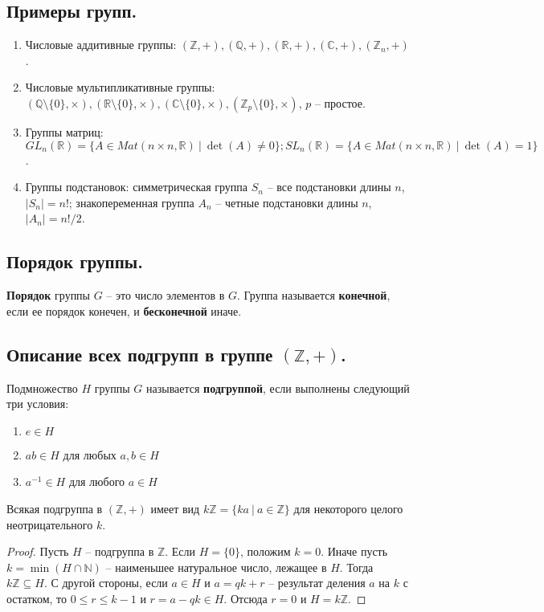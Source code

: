 \subsection{Примеры групп.}
\begin{enumerate}
    \item Числовые аддитивные группы: $(\mathbb{Z}, +), (\mathbb{Q}, +), (\mathbb{R}, +), (\mathbb{C}, +), (\mathbb{Z}_n, +)$.
    \item Числовые мультипликативные группы: $(\mathbb{Q} \setminus \{0\}, \times), (\mathbb{R} \setminus \{0\}, \times), (\mathbb{C} \setminus \{0\}, \times), (\mathbb{Z}_p \setminus \{0\}, \times)$, $p$ -- простое.
    \item Группы матриц: $GL_n(\mathbb{R}) = \{A \in Mat(n \times n, \mathbb{R}) \> | \> \det(A) \neq 0 \}; SL_n(\mathbb{R}) = \{A \in Mat(n \times n, \mathbb{R}) \> | \> \det(A) = 1 \}$.
    \item Группы подстановок: симметрическая группа $S_n$ -- все подстановки длины $n$, $|S_n| = n!$; знакопеременная группа $A_n$ -- четные подстановки длины $n$, $|A_n| = n!/2$.
\end{enumerate}

\subsection{Порядок группы.}
\begin{definition}
    \textbf{Порядок} группы $G$ -- это число элементов в $G$. Группа называется \textbf{конечной}, если ее порядок конечен, и \textbf{бесконечной} иначе.
\end{definition}


\subsection{Описание всех подгрупп в группе $(\mathbb{Z}, +)$.}
\begin{definition}
    Подмножество $H$ группы $G$ называется \textbf{подгруппой}, если выполнены следующий три условия:
    \begin{enumerate}
        \item $e \in H$
        \item $ab \in H$ для любых $a,b \in H$
        \item $a^{-1} \in H$ для любого $a \in H$
    \end{enumerate}
\end{definition}
\begin{statement}
    Всякая подгруппа в $(\mathbb{Z}, +)$ имеет вид $k\mathbb{Z} = \{ ka \> | \> a \in \mathbb{Z} \}$ для некоторого целого неотрицательного $k$.
    \begin{proof}
        Пусть $H$ -- подгруппа в $\mathbb{Z}$. Если $H = \{0\}$, положим $k = 0$. Иначе пусть $k = \min(H \cap \mathbb{N})$ -- наименьшее натуральное число, лежащее в $H$. Тогда $k\mathbb{Z} \subseteq H$. С другой стороны, если $a \in H$ и $a = qk + r$ -- результат деления $a$ на $k$ с остатком, то $0 \leqslant r \leqslant k - 1$ и $r = a - qk \in H$. Отсюда $r = 0$ и $H = k\mathbb{Z}$.
    \end{proof}
\end{statement}